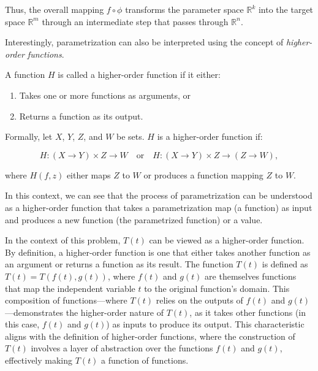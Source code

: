\documentclass[12pt,a4paper]{article}
\begin{document}
\begin{remark}
\begin{definition}[Parametrization]
Thus, the overall mapping \( f \circ \phi \) transforms the parameter space \( \mathbb{R}^k \) into the target space \( \mathbb{R}^m \) through an intermediate step that passes through \( \mathbb{R}^n \).

\end{definition}

Interestingly, parametrization can also be interpreted using the concept of \textit{higher-order functions}.

\begin{definition}
A function \( H \) is called a higher-order function if it either:
\begin{enumerate}
    \item Takes one or more functions as arguments, or
    \item Returns a function as its output.
\end{enumerate}

Formally, let \( X \), \( Y \), \( Z \), and \( W \) be sets. \( H \) is a higher-order function if:

\[
H: (X \to Y) \times Z \to W \quad \text{or} \quad H: (X \to Y) \times Z \to (Z \to W),
\]

where \( H(f, z) \) either maps \( Z \) to \( W \) or produces a function mapping \( Z \) to \( W \).
\end{definition}

In this context, we can see that the process of parametrization can be understood as a higher-order function that takes a parametrization map (a function) as input and produces a new function (the parametrized function) or a value.

In the context of this problem, \( T(t) \) can be viewed as a higher-order function. By definition, a higher-order function is one that either takes another function as an argument or returns a function as its result. The function \( T(t) \) is defined as \( T(t) = T(f(t), g(t)) \), where \( f(t) \) and \( g(t) \) are themselves functions that map the independent variable \( t \) to the original function's domain. This composition of functions—where \( T(t) \) relies on the outputs of \( f(t) \) and \( g(t) \)—demonstrates the higher-order nature of \( T(t) \), as it takes other functions (in this case, \( f(t) \) and \( g(t) \)) as inputs to produce its output. This characteristic aligns with the definition of higher-order functions, where the construction of \( T(t) \) involves a layer of abstraction over the functions \( f(t) \) and \( g(t) \), effectively making \( T(t) \) a function of functions.

\end{remark}
\end{document}
